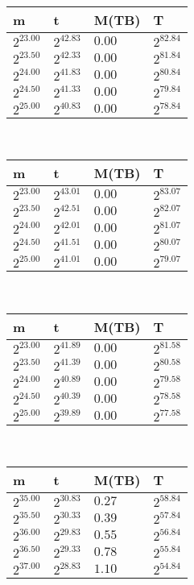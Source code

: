  \ 
\begin{tabular}{llll}
m & t & M(TB) & T \\ \hline
$2^{23.00}$ & $2^{42.83}$ & $0.00$ & $2^{82.84}$ \\
$2^{23.50}$ & $2^{42.33}$ & $0.00$ & $2^{81.84}$ \\
$2^{24.00}$ & $2^{41.83}$ & $0.00$ & $2^{80.84}$ \\
$2^{24.50}$ & $2^{41.33}$ & $0.00$ & $2^{79.84}$ \\
$2^{25.00}$ & $2^{40.83}$ & $0.00$ & $2^{78.84}$ \\
\end{tabular}
 \ 
\begin{tabular}{llll}
m & t & M(TB) & T \\ \hline
$2^{23.00}$ & $2^{43.01}$ & $0.00$ & $2^{83.07}$ \\
$2^{23.50}$ & $2^{42.51}$ & $0.00$ & $2^{82.07}$ \\
$2^{24.00}$ & $2^{42.01}$ & $0.00$ & $2^{81.07}$ \\
$2^{24.50}$ & $2^{41.51}$ & $0.00$ & $2^{80.07}$ \\
$2^{25.00}$ & $2^{41.01}$ & $0.00$ & $2^{79.07}$ \\
\end{tabular}
 \ 
\begin{tabular}{llll}
m & t & M(TB) & T \\ \hline
$2^{23.00}$ & $2^{41.89}$ & $0.00$ & $2^{81.58}$ \\
$2^{23.50}$ & $2^{41.39}$ & $0.00$ & $2^{80.58}$ \\
$2^{24.00}$ & $2^{40.89}$ & $0.00$ & $2^{79.58}$ \\
$2^{24.50}$ & $2^{40.39}$ & $0.00$ & $2^{78.58}$ \\
$2^{25.00}$ & $2^{39.89}$ & $0.00$ & $2^{77.58}$ \\
\end{tabular}
 \ 
\begin{tabular}{llll}
m & t & M(TB) & T \\ \hline
$2^{35.00}$ & $2^{30.83}$ & $0.27$ & $2^{58.84}$ \\
$2^{35.50}$ & $2^{30.33}$ & $0.39$ & $2^{57.84}$ \\
$2^{36.00}$ & $2^{29.83}$ & $0.55$ & $2^{56.84}$ \\
$2^{36.50}$ & $2^{29.33}$ & $0.78$ & $2^{55.84}$ \\
$2^{37.00}$ & $2^{28.83}$ & $1.10$ & $2^{54.84}$ \\
\end{tabular}
